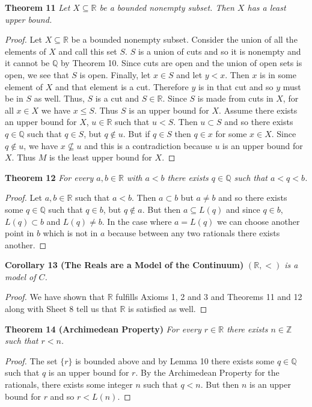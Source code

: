 \documentclass{article}
\begin{document}
\begin{flushleft}
\textbf{Theorem 11}
\textsl{Let $X \subseteq \mathbb{R}$ be a bounded nonempty subset. Then $X$ has a least upper bound.}
\begin{proof}
Let $X \subseteq \mathbb{R}$ be a bounded nonempty subset. Consider the union of all the elements of $X$ and call this set $S$. $S$ is a union of cuts and so it is nonempty and it cannot be $\mathbb{Q}$ by Theorem 10. Since cuts are open and the union of open sets is open, we see that $S$ is open. Finally, let $x \in S$ and let $y<x$. Then $x$ is in some element of $X$ and that element is a cut. Therefore $y$ is in that cut and so $y$ must be in $S$ as well. Thus, $S$ is a cut and $S \in \mathbb{R}$. Since $S$ is made from cuts in $X$, for all $x \in X$ we have $x \leq S$. Thus $S$ is an upper bound for $X$. Assume there exists an upper bound for $X$, $u \in \mathbb{R}$ such that $u<S$. Then $u \subset S$ and so there exists $q \in \mathbb{Q}$ such that $q \in S$, but $q \notin u$. But if $q \in S$ then $q \in x$ for some $x \in X$. Since $q \notin u$, we have $x \nsubseteq u$ and this is a contradiction because $u$ is an upper bound for $X$. Thus $M$ is the least upper bound for $X$.
\end{proof}

\textbf{Theorem 12}
\textsl{For every $a, b \in \mathbb{R}$ with $a<b$ there exists $q \in \mathbb{Q}$ such that $a<q<b$.}
\begin{proof}
Let $a,b \in \mathbb{R}$ such that $a<b$. Then $a \subset b$ but $a \neq b$ and so there exists some $q \in \mathbb{Q}$ such that $q \in b$, but $q \notin a$. But then $a \subseteq L(q)$ and since $q \in b$, $L(q) \subset b$ and $L(q) \neq b$. In the case where $a=L(q)$ we can choose another point in $b$ which is not in $a$ because between any two rationals there exists another.
\end{proof}

\textbf{Corollary 13 (The Reals are a Model of the Continuum)}
\textsl{$(\mathbb{R},<)$ is a model of $C$.}
\begin{proof}
We have shown that $\mathbb{R}$ fulfills Axioms 1, 2 and 3 and Theorems 11 and 12 along with Sheet 8 tell us that $\mathbb{R}$ is satisfied as well.
\end{proof}

\textbf{Theorem 14 (Archimedean Property)}
\textsl{For every $r \in \mathbb{R}$ there exists $n \in \mathbb{Z}$ such that $r<n$.}
\begin{proof}
The set $\{r\}$ is bounded above and by Lemma 10 there exists some $q \in \mathbb{Q}$ such that $q$ is an upper bound for $r$. By the Archimedean Property for the rationals, there exists some integer $n$ such that $q<n$. But then $n$ is an upper bound for $r$ and so $r < L(n)$.
\end{proof}


\end{flushleft}
\end{document}
